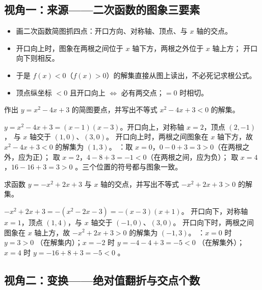 \begin{explore}

\subsection{视角一：来源——二次函数的图象三要素}

\begin{itemize}
  \item 画二次函数简图抓四点：开口方向、对称轴、顶点、与 $x$ 轴的交点。
  \item 开口向上时，图象在两根之间位于 $x$ 轴下方，两根之外位于 $x$ 轴上方；
        开口向下则相反。
  \item 于是 $f(x)<0$（$f(x)>0$）的解集直接从图上读出，不必死记求根公式。
  \item 顶点纵坐标 $<0$ 且开口向上 $\iff$ 必有两交点；$=0$ 时相切。
\end{itemize}

\begin{example}
作出 $y=x^2-4x+3$ 的简图要点，并写出不等式 $x^2-4x+3<0$ 的解集。
\end{example}
\begin{solution}
$y=x^2-4x+3=(x-1)(x-3)$。开口向上，对称轴 $x=2$，顶点 $(2,-1)$，
与 $x$ 轴交于 $(1,0)$、$(3,0)$。
开口向上时，两根之间图象在 $x$ 轴下方，故 $x^2-4x+3<0$ 的解集为 $(1,3)$。
：取 $x=0$，$0-0+3=3>0$（在两根之外，应为正）\checkmark；
取 $x=2$，$4-8+3=-1<0$（在两根之间，应为负）\checkmark；
取 $x=4$，$16-16+3=3>0$ \checkmark。三个位置的符号都与图象一致。
\end{solution}

\begin{problem}
求函数 $y=-x^2+2x+3$ 与 $x$ 轴的交点，并写出不等式 $-x^2+2x+3>0$ 的解集。
\end{problem}
\begin{solution}
$-x^2+2x+3=-(x^2-2x-3)=-(x-3)(x+1)$。
开口向下，对称轴 $x=1$，顶点 $(1,4)$，与 $x$ 轴交于 $(-1,0)$、$(3,0)$。
开口向下时，两根之间图象在 $x$ 轴上方，故 $-x^2+2x+3>0$ 的解集为 $(-1,3)$。
：$x=0$ 时 $y=3>0$ \checkmark（在解集内）；$x=-2$ 时 $y=-4-4+3=-5<0$ \checkmark（在解集外）；
$x=4$ 时 $y=-16+8+3=-5<0$ \checkmark。
\end{solution}

\subsection{视角二：变换——绝对值翻折与交点个数}


\end{explore}
